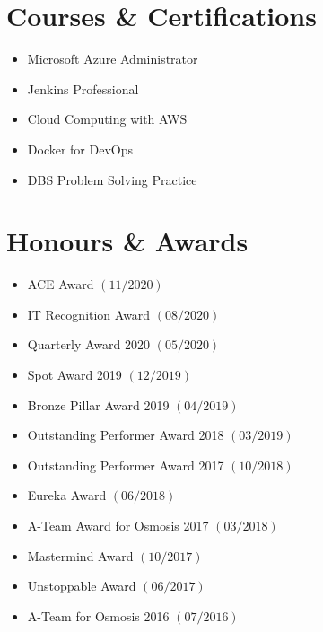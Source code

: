 \documentclass[11pt, a4paper]{article}
\begin{document}
\section*{Courses \& Certifications}
\vspace{-1.5mm}
\begin{itemize}[noitemsep, nolistsep]
\item[\scriptsize\faCertificate] Microsoft Azure Administrator
\item[\scriptsize\faCertificate] Jenkins Professional
\item[\scriptsize\faCertificate] Cloud Computing with AWS
\item[\scriptsize\faCertificate] Docker for DevOps
\item[\scriptsize\faCertificate] DBS Problem Solving Practice
\end{itemize}

\section*{Honours \& Awards}
\vspace{-1.5mm}
\begin{itemize}[noitemsep, nolistsep]
\item[\scriptsize\faTrophy] ACE Award $(11/2020)$
\item[\scriptsize\faTrophy] IT Recognition Award $(08/2020)$
\item[\scriptsize\faTrophy] Quarterly Award 2020 $(05/2020)$
\item[\scriptsize\faTrophy] Spot Award 2019 $(12/2019)$
\item[\scriptsize\faTrophy] Bronze Pillar Award 2019 $(04/2019)$
\item[\scriptsize\faTrophy] Outstanding Performer Award 2018 $(03/2019)$
\item[\scriptsize\faTrophy] Outstanding Performer Award 2017 $(10/2018)$
\item[\scriptsize\faTrophy] Eureka Award $(06/2018)$
\item[\scriptsize\faTrophy] A-Team Award for Osmosis 2017 $(03/2018)$
\item[\scriptsize\faTrophy] Mastermind Award $(10/2017)$
\item[\scriptsize\faTrophy] Unstoppable Award $(06/2017)$
\item[\scriptsize\faTrophy] A-Team for Osmosis 2016 $(07/2016)$
\end{itemize}
\end{document}
